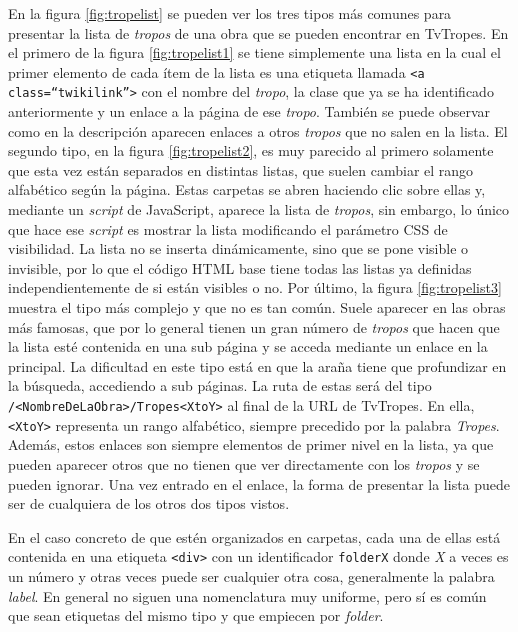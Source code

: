 En la figura \ref{fig:tropelist} se pueden ver los tres tipos más comunes para
presentar la lista de \textit{tropos} de una obra que se pueden encontrar en
TvTropes. En el primero de la figura \ref{fig:tropelist1} se tiene simplemente
una lista en la cual el primer elemento de cada ítem de la lista es una etiqueta
llamada \texttt{<a class=``twikilink''>} con el nombre del \textit{tropo}, la
clase que ya se ha identificado anteriormente y un enlace a la página de ese
\textit{tropo}. También se puede observar como en la descripción aparecen
enlaces a otros \textit{tropos} que no salen en la lista. El segundo tipo, en la
figura \ref{fig:tropelist2}, es muy parecido al primero solamente que esta vez
están separados en distintas listas, que suelen cambiar el rango alfabético
según la página. Estas carpetas se abren haciendo clic sobre ellas y, mediante
un \textit{script} de JavaScript, aparece la lista de \textit{tropos}, sin
embargo, lo único que hace ese \textit{script} es mostrar la lista modificando
el parámetro CSS de visibilidad. La lista no se inserta dinámicamente, sino que
se pone visible o invisible, por lo que el código HTML base tiene todas las
listas ya definidas independientemente de si están visibles o no. Por último, la
figura \ref{fig:tropelist3} muestra el tipo más complejo y que no es tan común.
Suele aparecer en las obras más famosas, que por lo general tienen un gran
número de \textit{tropos} que hacen que la lista esté contenida en una sub
página y se acceda mediante un enlace en la principal. La dificultad en este
tipo está en que la araña tiene que profundizar en la búsqueda, accediendo a sub
páginas. La ruta de estas será del tipo \texttt{/<NombreDeLaObra>/Tropes<XtoY>}
al final de la URL de TvTropes. En ella, \texttt{<XtoY>} representa un rango
alfabético, siempre precedido por la palabra \textit{Tropes}. Además, estos
enlaces son siempre elementos de primer nivel en la lista, ya que pueden
aparecer otros que no tienen que ver directamente con los \textit{tropos} y se
pueden ignorar. Una vez entrado en el enlace, la forma de presentar la lista
puede ser de cualquiera de los otros dos tipos vistos.

En el caso concreto de que estén organizados en carpetas, cada una de ellas está
contenida en una etiqueta \texttt{<div>} con un identificador \texttt{folderX}
donde \textit{X} a veces es un número y otras veces puede ser cualquier otra
cosa, generalmente la palabra \textit{label}. En general no siguen una
nomenclatura muy uniforme, pero sí es común que sean etiquetas del mismo tipo y
que empiecen por \textit{folder}. 

